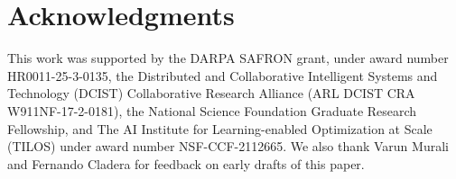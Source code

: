 \documentclass[conference]{IEEEtran}
\begin{document}
\IEEEpeerreviewmaketitle

















\section*{Acknowledgments}
This work was supported by the DARPA SAFRON grant, under award number HR0011-25-3-0135, the Distributed and Collaborative Intelligent Systems and Technology (DCIST) Collaborative Research Alliance (ARL DCIST CRA W911NF-17-2-0181), the National Science Foundation Graduate Research Fellowship, and The AI Institute for Learning-enabled Optimization at Scale (TILOS) under award number NSF-CCF-2112665. We also thank Varun Murali and Fernando Cladera for feedback on early drafts of this paper.





\newpage

\end{document}
